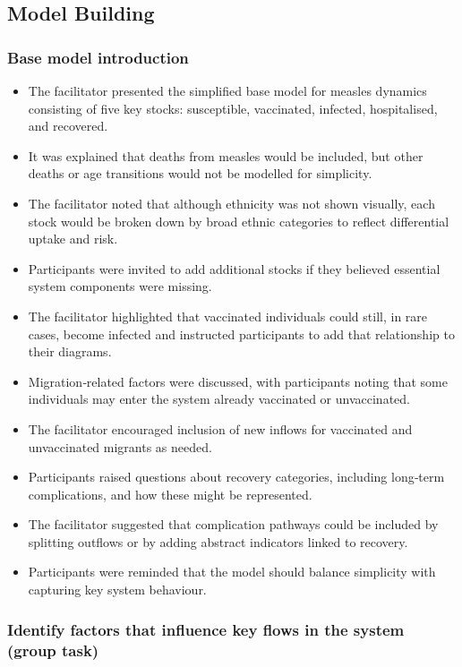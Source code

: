 \documentclass{article}
\begin{document}
\subsection{Model Building}

\subsubsection{Base model introduction}

\begin{itemize}
    \item The facilitator presented the simplified base model for measles dynamics consisting of five key stocks: susceptible, vaccinated, infected, hospitalised, and recovered.
    \item It was explained that deaths from measles would be included, but other deaths or age transitions would not be modelled for simplicity.
    \item The facilitator noted that although ethnicity was not shown visually, each stock would be broken down by broad ethnic categories to reflect differential uptake and risk.
    \item Participants were invited to add additional stocks if they believed essential system components were missing.
    \item The facilitator highlighted that vaccinated individuals could still, in rare cases, become infected and instructed participants to add that relationship to their diagrams.
    \item Migration‑related factors were discussed, with participants noting that some individuals may enter the system already vaccinated or unvaccinated.
    \item The facilitator encouraged inclusion of new inflows for vaccinated and unvaccinated migrants as needed.
    \item Participants raised questions about recovery categories, including long‑term complications, and how these might be represented.
    \item The facilitator suggested that complication pathways could be included by splitting outflows or by adding abstract indicators linked to recovery.
    \item Participants were reminded that the model should balance simplicity with capturing key system behaviour.
\end{itemize}

\subsubsection{Identify factors that influence key flows in the system (group task)}
\end{document}
